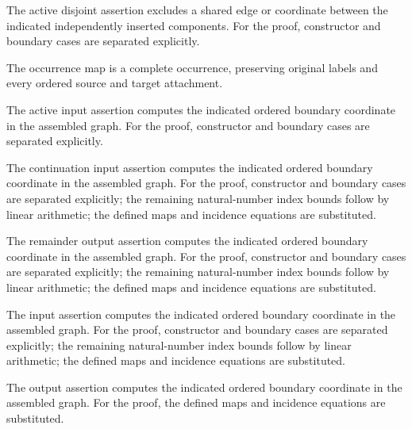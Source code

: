 The active disjoint assertion excludes a shared edge or coordinate between the indicated independently inserted components.
For the proof, constructor and boundary cases are separated explicitly.
\par{}

The occurrence map is a complete occurrence, preserving original labels and every ordered source and target attachment.
\par{}

The active input assertion computes the indicated ordered boundary coordinate in the assembled graph.
For the proof, constructor and boundary cases are separated explicitly.
\par{}

The continuation input assertion computes the indicated ordered boundary coordinate in the assembled graph.
For the proof, constructor and boundary cases are separated explicitly; the remaining natural-number index bounds follow by linear arithmetic; the defined maps and incidence equations are substituted.
\par{}

The remainder output assertion computes the indicated ordered boundary coordinate in the assembled graph.
For the proof, constructor and boundary cases are separated explicitly; the remaining natural-number index bounds follow by linear arithmetic; the defined maps and incidence equations are substituted.
\par{}

The input assertion computes the indicated ordered boundary coordinate in the assembled graph.
For the proof, constructor and boundary cases are separated explicitly; the remaining natural-number index bounds follow by linear arithmetic; the defined maps and incidence equations are substituted.
\par{}

The output assertion computes the indicated ordered boundary coordinate in the assembled graph.
For the proof, the defined maps and incidence equations are substituted.
\par{}


